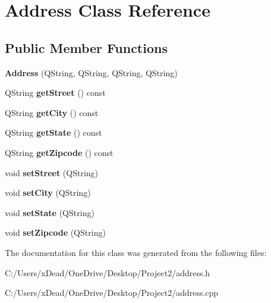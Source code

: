 \hypertarget{class_address}{}\section{Address Class Reference}
\label{class_address}
\subsection*{Public Member Functions}
\begin{DoxyCompactItemize}
\item 
\mbox{\label{class_address_a5c68563a6b310303b45e9a6039e3c864}} 
{\bfseries Address} (Q\+String, Q\+String, Q\+String, Q\+String)
\item 
\mbox{\label{class_address_a037162cf463da68ebfb7e869d9b8daa7}} 
Q\+String {\bfseries get\+Street} () const
\item 
\mbox{\label{class_address_af141f342e0daefab05570f89ee403c3e}} 
Q\+String {\bfseries get\+City} () const
\item 
\mbox{\label{class_address_a1ed06486ceb4112dcacf9b8d75884b85}} 
Q\+String {\bfseries get\+State} () const
\item 
\mbox{\label{class_address_a54a354e4814fee3cc5ed7fee20971caa}} 
Q\+String {\bfseries get\+Zipcode} () const
\item 
\mbox{\label{class_address_a96c14a0d39d4a56ac7075dcc22dba017}} 
void {\bfseries set\+Street} (Q\+String)
\item 
\mbox{\label{class_address_a3cb9ecc691ff800543225f7330b14f58}} 
void {\bfseries set\+City} (Q\+String)
\item 
\mbox{\label{class_address_a0b2983553c0b63cca5f0eb232a228c0e}} 
void {\bfseries set\+State} (Q\+String)
\item 
\mbox{\label{class_address_a3ed211939cd12407b1f6b6bd30afb9d1}} 
void {\bfseries set\+Zipcode} (Q\+String)
\end{DoxyCompactItemize}


The documentation for this class was generated from the following files\+:\begin{DoxyCompactItemize}
\item 
C\+:/\+Users/x\+Dead/\+One\+Drive/\+Desktop/\+Project2/address.\+h\item 
C\+:/\+Users/x\+Dead/\+One\+Drive/\+Desktop/\+Project2/address.\+cpp\end{DoxyCompactItemize}
